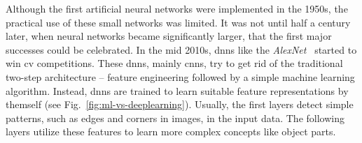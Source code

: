 Although the first artificial neural networks were implemented in the 1950s, the practical use of these small networks was limited. It was not until half a century later, when neural networks became significantly larger, that the first major successes could be celebrated. In the mid 2010s, \glspl{dnn} like the \textit{AlexNet}~\cite{krizhevsky2012imagenet} started to win \gls{cv} competitions. These \glspl{dnn}, mainly \glspl{cnn}, try to get rid of the traditional two-step architecture -- feature engineering followed by a simple machine learning algorithm. Instead, \glspl{dnn} are trained to learn suitable feature representations by themself (see Fig.~\ref{fig:ml-vs-deeplearning}). Usually, the first layers detect simple patterns, such as edges and corners in images, in the input data. The following layers utilize these features to learn more complex concepts like object parts.\\

